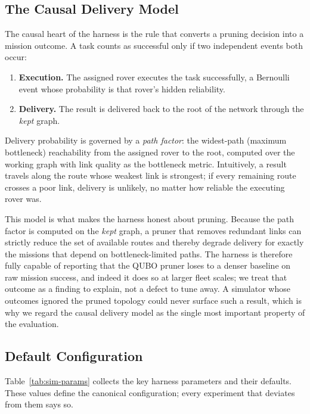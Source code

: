 \subsection{The Causal Delivery Model}

The causal heart of the harness is the rule that converts a pruning
decision into a mission outcome. A task counts as successful only if two
independent events both occur:

\begin{enumerate}
  \item \textbf{Execution.} The assigned rover executes the task
    successfully, a Bernoulli event whose probability is that rover's
    hidden reliability.
  \item \textbf{Delivery.} The result is delivered back to the root of
    the network through the \emph{kept} graph.
\end{enumerate}

Delivery probability is governed by a \emph{path factor}: the widest-path
(maximum bottleneck) reachability from the assigned rover to the root,
computed over the working graph with link quality as the bottleneck
metric. Intuitively, a result travels along the route whose weakest link
is strongest; if every remaining route crosses a poor link, delivery is
unlikely, no matter how reliable the executing rover was.

This model is what makes the harness honest about pruning. Because the
path factor is computed on the \emph{kept} graph, a pruner that removes
redundant links can strictly reduce the set of available routes and
thereby degrade delivery for exactly the missions that depend on
bottleneck-limited paths. The harness is therefore fully capable of
reporting that the QUBO pruner loses to a denser baseline on raw mission
success, and indeed it does so at larger fleet scales; we treat that
outcome as a finding to explain, not a defect to tune away. A simulator
whose outcomes ignored the pruned topology could never surface such a
result, which is why we regard the causal delivery model as the single
most important property of the evaluation.

\subsection{Default Configuration}

Table~\ref{tab:sim-params} collects the key harness parameters and their
defaults. These values define the canonical configuration; every
experiment that deviates from them says so.

